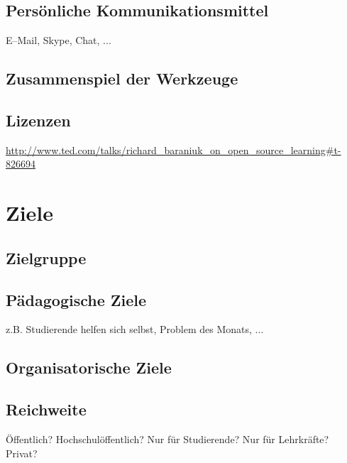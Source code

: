 \subsection{Persönliche Kommunikationsmittel} %
\label{sub:personliche_kommunikationsmittel}
E--Mail, Skype, Chat, ...

\subsection{Zusammenspiel der Werkzeuge} %
\label{sub:zusammenspiel_der_werkzeuge}


\subsection{Lizenzen} %
\label{sub:lizenzen}

\url{http://www.ted.com/talks/richard_baraniuk_on_open_source_learning#t-826694}




\section{Ziele} %
\label{sec:ziele}

\subsection{Zielgruppe} %
\label{sub:zielgruppe}


\subsection{Pädagogische Ziele} %
\label{sub:padagogische_ziele}
z.B. Studierende helfen sich selbst, Problem des Monats, ...

\subsection{Organisatorische Ziele} %
\label{sub:organisatorische_ziele}


\subsection{Reichweite} %
\label{sub:reichweite}
Öffentlich? Hochschulöffentlich? Nur für Studierende? Nur für Lehrkräfte? Privat?

